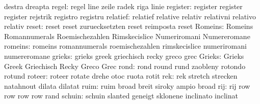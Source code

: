                            destra                    dreapta
                    regel: regel                     line
                           zeile                     radek
                           riga                      linie
                 register: register                  register
                           register                  rejstrik
                           registro                  registru
                 relatief: relatief                  relative
                           relativ                   relativni
                           relativo                  relativ
                    reset: reset                     reset
                           zuruecksetzten            reset
                           reimposta                 reset
                  Romeins: Romeins                   Romannumerals
                           Roemischezahlen           Rimskecislice
                           Numeriromani              Numereromane
                  romeins: romeins                   romannumerals
                           roemischezahlen           rimskecislice
                           numeriromani              numereromane
                   grieks: grieks                    greek
                           griechisch                recky
                           greco                     grec
                   Grieks: Grieks                    Greek
                           Griechisch                Recky
                           Greco                     Grec
                     rond: rond                      round
                           rund                      zaobleny
                           rotondo                   rotund
                   roteer: roteer                    rotate
                           drehe                     otoc
                           ruota                     rotit
                      rek: rek                       stretch
                           strecken                  natahnout
                           dilata                    dilatat
                     ruim: ruim                      broad
                           breit                     siroky
                           ampio                     broad
                      rij: rij                       row
                           row                       row
                           row                       rand
                   schuin: schuin                    slanted
                           geneigt                   sklonene
                           inclinato                 inclinat

